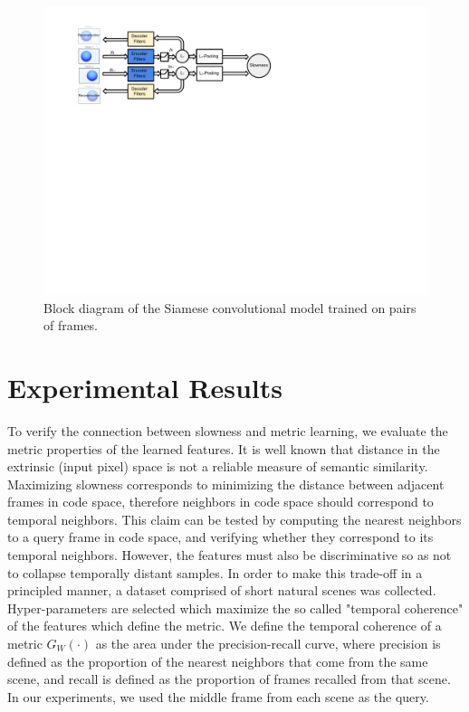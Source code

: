 \begin{figure} \centering
\includegraphics[scale=0.75,trim = 15 350 290 39,clip]{./figures/slow/Rebbutal_Figures/diagram.pdf} \caption{Block diagram of the Siamese convolutional model trained on pairs of frames. 
\label{fig:diagram}}
\end{figure} 
\section{Experimental Results} To verify the connection between
slowness and metric learning, we evaluate the metric properties of the learned
features. It is well known that distance in the extrinsic (input pixel) space
is not a reliable measure of semantic similarity. Maximizing slowness
corresponds to minimizing the distance between adjacent frames in code space,
therefore neighbors in code space should correspond to temporal neighbors. This
claim can be tested by computing the nearest neighbors to a query frame in code
space, and verifying whether they correspond to its temporal neighbors.
However, the features must also be discriminative so as not to collapse
temporally distant samples. In order to make this trade-off in a principled
manner, a dataset comprised of short natural scenes was collected.
Hyper-parameters are selected which maximize the so called "temporal coherence"
of the features which define the metric. We define the temporal coherence of a
metric $G_W(\cdot)$ as the area under the precision-recall curve, where
precision is defined as the proportion of the nearest neighbors that come from
the same scene, and recall is defined as the proportion of frames recalled from
that scene. In our experiments, we used the middle frame from each scene as the
query. 

